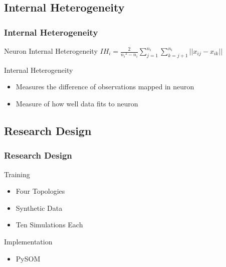 \documentclass[nototal,handout]{beamer}
\begin{document}
\subsection{Internal Heterogeneity} 

\begin{frame}
	\frametitle{Internal Heterogeneity}
 
\begin{block}{Neuron Internal Heterogeneity}
  \({IH_i} = \frac{2}{{n_i}^2-{n_i}}\sum_{j=1}^{n_i}\sum_{k=j+1}^{n_i} ||{x_{ij}}-{x_{ik}}||\)
 \end{block} 
\begin{block}{Internal Heterogeneity}
 \begin{itemize}
 \item  Measures the difference of observations mapped in neuron
 \item  Measure of how well data fits to neuron
 \end{itemize}
 \end{block} \end{frame} 

\subsection{Research Design} 

\begin{frame}
	\frametitle{Research Design}
 
\begin{block}{Training}
 \begin{itemize}
 \item  Four Topologies
 \item  Synthetic Data
 \item  Ten Simulations Each
 \end{itemize}
 \end{block} 
\begin{block}{Implementation}
 \begin{itemize}
 \item  PySOM
 \end{itemize}
 \end{block} \end{frame} 
\end{document}
